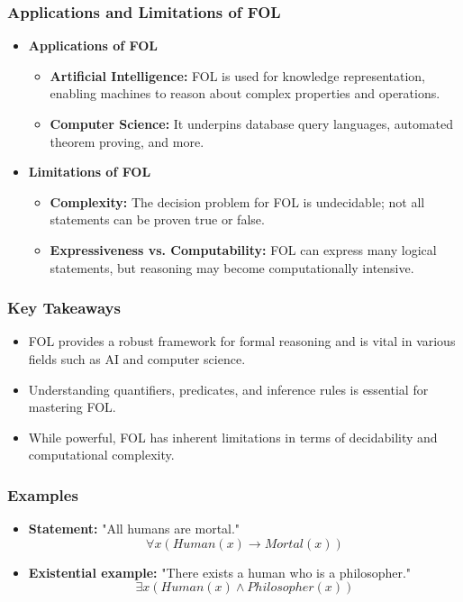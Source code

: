 \documentclass[aspectratio=169]{beamer}
\begin{document}
\begin{frame}[fragile]
    \frametitle{Applications and Limitations of FOL}
    \begin{itemize}
        \item \textbf{Applications of FOL}
        \begin{itemize}
            \item \textbf{Artificial Intelligence:} FOL is used for knowledge representation, enabling machines to reason about complex properties and operations.
            \item \textbf{Computer Science:} It underpins database query languages, automated theorem proving, and more.
        \end{itemize}
        
        \item \textbf{Limitations of FOL}
        \begin{itemize}
            \item \textbf{Complexity:} The decision problem for FOL is undecidable; not all statements can be proven true or false.
            \item \textbf{Expressiveness vs. Computability:} FOL can express many logical statements, but reasoning may become computationally intensive.
        \end{itemize}
    \end{itemize}
\end{frame}

\begin{frame}[fragile]
    \frametitle{Key Takeaways}
    \begin{itemize}
        \item FOL provides a robust framework for formal reasoning and is vital in various fields such as AI and computer science.
        \item Understanding quantifiers, predicates, and inference rules is essential for mastering FOL.
        \item While powerful, FOL has inherent limitations in terms of decidability and computational complexity.
    \end{itemize}
\end{frame}

\begin{frame}[fragile]
    \frametitle{Examples}
    \begin{itemize}
        \item \textbf{Statement:} "All humans are mortal."
        \begin{equation}
            \forall x (Human(x) \rightarrow Mortal(x))
        \end{equation}

        \item \textbf{Existential example:} "There exists a human who is a philosopher."
        \begin{equation}
            \exists x (Human(x) \land Philosopher(x))
        \end{equation}
    \end{itemize}
\end{frame}
\end{document}
